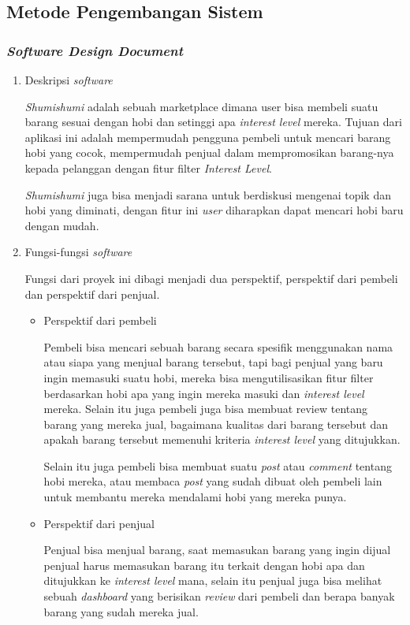 \documentclass[a4paper]{article}
\newcommand{\subbab}[1]{%
    \subsection{#1}%
    \setcounter{figure}{0}
    \setcounter{table}{0}
}
\newcommand{\subsubbab}[1]{%
    \subsubsection{#1}%
}
\begin{document}
\newpage
\subbab{Metode Pengembangan Sistem}
\subsubbab{\textit{Software Design Document}}
\begin{enumerate}[label=\alph*. ]
    \item Deskripsi \textit{software}

          \textit{Shumishumi} adalah sebuah marketplace dimana user bisa membeli suatu barang sesuai dengan hobi dan setinggi apa \textit{interest level} mereka. Tujuan dari aplikasi ini adalah mempermudah pengguna pembeli untuk mencari barang hobi yang cocok, mempermudah penjual dalam mempromosikan barang-nya kepada pelanggan dengan fitur filter \textit{Interest Level}.


          \textit{Shumishumi} juga bisa menjadi sarana untuk berdiskusi mengenai topik dan hobi yang diminati, dengan fitur ini \textit{user} diharapkan dapat mencari hobi baru dengan mudah.

    \item Fungsi-fungsi \textit{software}


          Fungsi dari proyek ini dibagi menjadi dua perspektif, perspektif dari pembeli dan perspektif dari penjual.
          \begin{itemize}
              \item Perspektif dari pembeli

                    Pembeli bisa mencari sebuah barang secara spesifik menggunakan nama atau siapa yang menjual barang tersebut, tapi bagi penjual yang baru ingin memasuki suatu hobi, mereka bisa mengutilisasikan fitur filter berdasarkan hobi apa yang ingin mereka masuki dan \textit{interest level} mereka. Selain itu juga pembeli juga bisa membuat review tentang barang yang mereka jual, bagaimana kualitas dari barang tersebut dan apakah barang tersebut memenuhi kriteria \textit{interest level} yang ditujukkan.

                    Selain itu juga pembeli bisa membuat suatu \textit{post} atau \textit{comment} tentang hobi mereka, atau membaca \textit{post} yang sudah dibuat oleh pembeli lain untuk membantu mereka mendalami hobi yang mereka punya.

              \item Perspektif dari penjual

                    Penjual bisa menjual barang, saat memasukan barang yang ingin dijual penjual harus memasukan barang itu terkait dengan hobi apa dan ditujukkan ke \textit{interest level} mana, selain itu penjual juga bisa melihat sebuah \textit{dashboard} yang berisikan \textit{review} dari pembeli dan berapa banyak barang yang sudah mereka jual.
          \end{itemize}


\end{enumerate}
\end{document}
